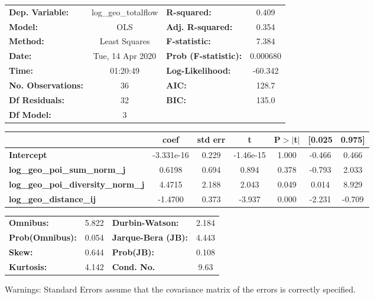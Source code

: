 \begin{center}
\begin{tabular}{lclc}
\toprule
\textbf{Dep. Variable:}                    & log\_geo\_totalflow & \textbf{  R-squared:         } &     0.409   \\
\textbf{Model:}                            &         OLS         & \textbf{  Adj. R-squared:    } &     0.354   \\
\textbf{Method:}                           &    Least Squares    & \textbf{  F-statistic:       } &     7.384   \\
\textbf{Date:}                             &   Tue, 14 Apr 2020  & \textbf{  Prob (F-statistic):} &  0.000680   \\
\textbf{Time:}                             &       01:20:49      & \textbf{  Log-Likelihood:    } &   -60.342   \\
\textbf{No. Observations:}                 &            36       & \textbf{  AIC:               } &     128.7   \\
\textbf{Df Residuals:}                     &            32       & \textbf{  BIC:               } &     135.0   \\
\textbf{Df Model:}                         &             3       & \textbf{                     } &             \\
\bottomrule
\end{tabular}
\begin{tabular}{lcccccc}
                                           & \textbf{coef} & \textbf{std err} & \textbf{t} & \textbf{P$> |$t$|$} & \textbf{[0.025} & \textbf{0.975]}  \\
\midrule
\textbf{Intercept}                         &   -3.331e-16  &        0.229     & -1.46e-15  &         1.000        &       -0.466    &        0.466     \\
\textbf{log\_geo\_poi\_sum\_norm\_j}       &       0.6198  &        0.694     &     0.894  &         0.378        &       -0.793    &        2.033     \\
\textbf{log\_geo\_poi\_diversity\_norm\_j} &       4.4715  &        2.188     &     2.043  &         0.049        &        0.014    &        8.929     \\
\textbf{log\_geo\_distance\_ij}            &      -1.4700  &        0.373     &    -3.937  &         0.000        &       -2.231    &       -0.709     \\
\bottomrule
\end{tabular}
\begin{tabular}{lclc}
\textbf{Omnibus:}       &  5.822 & \textbf{  Durbin-Watson:     } &    2.184  \\
\textbf{Prob(Omnibus):} &  0.054 & \textbf{  Jarque-Bera (JB):  } &    4.443  \\
\textbf{Skew:}          &  0.644 & \textbf{  Prob(JB):          } &    0.108  \\
\textbf{Kurtosis:}      &  4.142 & \textbf{  Cond. No.          } &     9.63  \\
\bottomrule
\end{tabular}
\end{center}

Warnings: \newline
 [1] Standard Errors assume that the covariance matrix of the errors is correctly specified.